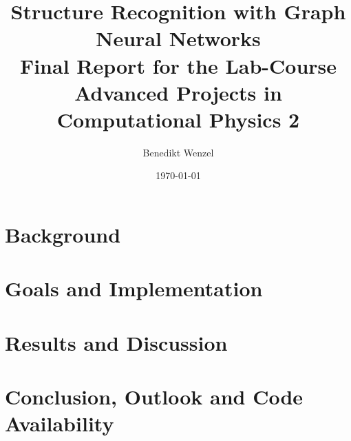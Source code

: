 \documentclass[12pt]{article}
\title{Structure Recognition with Graph Neural Networks \\[1em] \large Final Report for the Lab-Course Advanced Projects in Computational Physics 2}
\author{Benedikt Wenzel}
\date{\today}
\begin{document}
\maketitle
\begin{abstract}

\end{abstract}

\tableofcontents
\newpage

\section{Background}


\newpage
\section{Goals and Implementation}


\newpage
\section{Results and Discussion}


\newpage
\section{Conclusion, Outlook and Code Availability}


\newpage
\printbibliography
\end{document}
